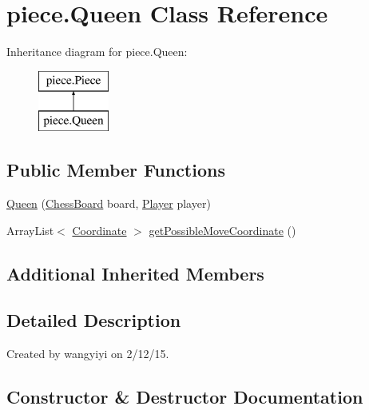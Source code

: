\hypertarget{classpiece_1_1_queen}{}\section{piece.\+Queen Class Reference}
\label{classpiece_1_1_queen}
Inheritance diagram for piece.\+Queen\+:\begin{figure}[H]
\begin{center}
\leavevmode
\includegraphics[height=2.000000cm]{classpiece_1_1_queen}
\end{center}
\end{figure}
\subsection*{Public Member Functions}
\begin{DoxyCompactItemize}
\item 
\hyperlink{classpiece_1_1_queen_ab07236b4d2d74af4752527d4be4d0e37}{Queen} (\hyperlink{classchess_1_1_chess_board}{Chess\+Board} board, \hyperlink{enumchess_1_1_player}{Player} player)
\item 
Array\+List$<$ \hyperlink{classpiece_1_1_coordinate}{Coordinate} $>$ \hyperlink{classpiece_1_1_queen_acaedb2b5fe8ca1ffac745ef059d2466c}{get\+Possible\+Move\+Coordinate} ()
\end{DoxyCompactItemize}
\subsection*{Additional Inherited Members}


\subsection{Detailed Description}
Created by wangyiyi on 2/12/15. 

\subsection{Constructor \& Destructor Documentation}
\hypertarget{classpiece_1_1_queen_ab07236b4d2d74af4752527d4be4d0e37}{}
